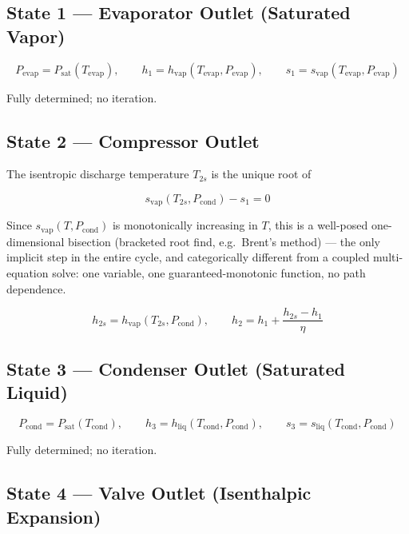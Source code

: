 \documentclass[11pt]{article}
\begin{document}
\subsection*{State 1 --- Evaporator Outlet (Saturated Vapor)}

\begin{equation}
P_{\text{evap}} = P_{\text{sat}}(T_{\text{evap}}), \qquad
h_1 = h_{\text{vap}}(T_{\text{evap}}, P_{\text{evap}}), \qquad
s_1 = s_{\text{vap}}(T_{\text{evap}}, P_{\text{evap}})
\end{equation}

Fully determined; no iteration.

\subsection*{State 2 --- Compressor Outlet}
\label{sec:state2}

The isentropic discharge temperature $T_{2s}$ is the unique root of

\begin{equation}
s_{\text{vap}}(T_{2s}, P_{\text{cond}}) - s_1 = 0
\end{equation}

Since $s_{\text{vap}}(T, P_{\text{cond}})$ is monotonically increasing in
$T$, this is a well-posed one-dimensional bisection (bracketed root find,
e.g.\ Brent's method) --- the only implicit step in the entire cycle, and
categorically different from a coupled multi-equation solve: one variable,
one guaranteed-monotonic function, no path dependence.

\begin{equation}
h_{2s} = h_{\text{vap}}(T_{2s}, P_{\text{cond}}), \qquad
h_2 = h_1 + \frac{h_{2s} - h_1}{\eta}
\end{equation}

\subsection*{State 3 --- Condenser Outlet (Saturated Liquid)}

\begin{equation}
P_{\text{cond}} = P_{\text{sat}}(T_{\text{cond}}), \qquad
h_3 = h_{\text{liq}}(T_{\text{cond}}, P_{\text{cond}}), \qquad
s_3 = s_{\text{liq}}(T_{\text{cond}}, P_{\text{cond}})
\end{equation}

Fully determined; no iteration.

\subsection*{State 4 --- Valve Outlet (Isenthalpic Expansion)}
\end{document}

